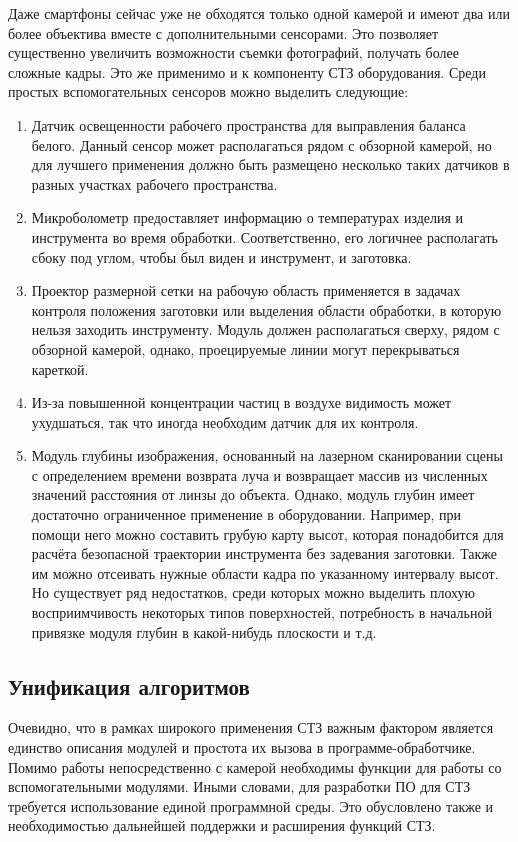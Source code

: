 Даже смартфоны сейчас уже не обходятся только одной камерой и имеют два или более объектива вместе с дополнительными сенсорами. Это позволяет существенно увеличить возможности съемки фотографий, получать более сложные кадры. Это же применимо и к компоненту СТЗ оборудования. Среди простых вспомогательных сенсоров можно выделить следующие:

\begin{enumerate}
	\item Датчик освещенности рабочего пространства для выправления баланса белого. Данный сенсор может располагаться рядом с обзорной камерой, но для лучшего применения должно быть размещено несколько таких датчиков в разных участках рабочего пространства.
	\item Микроболометр предоставляет информацию о температурах изделия и инструмента во время обработки. Соответственно, его логичнее располагать сбоку под углом, чтобы был виден и инструмент, и заготовка.
	\item Проектор размерной сетки на рабочую область применяется в задачах контроля положения заготовки или выделения области обработки, в которую нельзя заходить инструменту. Модуль должен располагаться сверху, рядом с обзорной камерой, однако, проецируемые линии могут перекрываться кареткой.
	\item Из-за повышенной концентрации частиц в воздухе видимость может ухудшаться, так что иногда необходим датчик для их контроля.
	\item Модуль глубины изображения, основанный на лазерном сканировании сцены с определением времени возврата луча и возвращает массив из численных значений расстояния от линзы до объекта. Однако, модуль глубин имеет достаточно ограниченное применение в оборудовании. Например, при помощи него можно составить грубую карту высот, которая понадобится для расчёта безопасной траектории инструмента без задевания заготовки. Также им можно отсеивать нужные области кадра по указанному интервалу высот. Но существует ряд недостатков, среди которых можно выделить плохую восприимчивость некоторых типов поверхностей, потребность в начальной привязке модуля глубин в какой-нибудь плоскости и т.д.
\end{enumerate}

\subsection{Унификация алгоритмов} \label{ssect3_3_4}

Очевидно, что в рамках широкого применения СТЗ важным фактором является единство описания модулей и простота их вызова в программе-обработчике. Помимо работы непосредственно с камерой необходимы функции для работы со вспомогательными модулями. Иными словами, для разработки ПО для СТЗ требуется использование единой программной среды. Это обусловлено также и необходимостью дальнейшей поддержки и расширения функций СТЗ.

